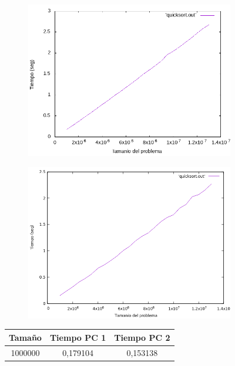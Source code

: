 \documentclass[12pt,spanish]{article}
\begin{document}
\begin{figure}[H]
\centering
\begin{subfigure}[b]{0.45\textwidth}
\includegraphics[scale=0.45]{empirica_quicksort.png}
\caption{}
\end{subfigure}
\quad
\begin{subfigure}[b]{0.45\textwidth}
\includegraphics[scale=0.45]{empirica_quicksort_2.png}
\caption{}
\end{subfigure}
\begin{tabular}{|c|c|c|}
\hline
\textbf{Tamaño} & \textbf{Tiempo PC 1} & \textbf{Tiempo PC 2} \\
\hline
1000000 & 0,179104 & 0,153138 \\

\end{tabular}
\end{figure}
\end{document}
